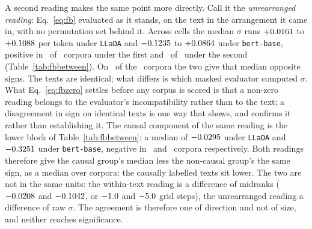 \begin{table}[tbp]
\centering

\caption{The unrearranged reading of Eq.~\eqref{eq:fb}: each text scored
once in each direction, in the arrangement it came in, with no permutation
set and no midrank.  \emph{Upper block}: the median $\sigma$ over all of a
cell's texts, both label groups together, per token.  It is not the authored
component of Eq.~\eqref{eq:auth}, which is a midrank against a null of
$0.50$; the null here is $\sigma = 0$.  \emph{Lower block}: the causal
component of this reading --- the median $\sigma$ of the causally labelled
texts less that of the non-causal ones --- which shares its name with
Eq.~\eqref{eq:caus} but is a difference of raw $\sigma$ values rather than
of midranks.  For a masked evaluator whose conditionals derive from a joint
every entry of both blocks would be exactly zero by Eq.~\eqref{eq:fbzero}.
None is, and on \FbBetweenNOpposite\ of the \FbBetweenNCompared\ corpora
the two masked evaluators give the upper block's median $\sigma$ opposite
signs.}
\label{tab:fbbetween}
\end{table}

A second reading makes the same point more directly.  Call it the
\emph{unrearranged reading}: Eq.~\eqref{eq:fb} evaluated as it stands, on
the text in the arrangement it came in, with no permutation set behind it.
Across cells the median $\sigma$
runs $+0.0161$ to $+0.1088$ per token under
\texttt{LLaDA} and $-0.1235$ to $+0.0864$ under
\texttt{bert-base}, positive in \FbBetweenNPosLLaDA\ of
\FbBetweenNOfLLaDA\ corpora under the first and \FbBetweenNPosBertBase\ of
\FbBetweenNOfBertBase\ under the second (Table~\ref{tab:fbbetween}).  On
\FbBetweenNOpposite\ of the \FbBetweenNCompared\ corpora the two give that
median opposite signs.  The texts are identical; what differs is which masked
evaluator computed $\sigma$.  What Eq.~\eqref{eq:fbzero} settles before any
corpus is scored is that a non-zero reading belongs to the evaluator's
incompatibility rather than to the text; a disagreement in sign on identical
texts is one way that shows, and confirms it rather than establishing it.  The causal
component of the same reading is the lower block of
Table~\ref{tab:fbbetween}: a median of $-0.0295$ under
\texttt{LLaDA} and $-0.3251$ under \texttt{bert-base},
negative in \FbBetweenNNegOfLLaDA\ and \FbBetweenNNegOfBertBase\ corpora
respectively.  Both readings therefore give the causal group's median less
the non-causal group's the same sign, as a median over corpora: the causally
labelled texts sit lower.  The two are not in the same units: the
within-text reading is a difference of midranks ($-0.0208$ and
$-0.1042$, or $-1.0$ and
$-5.0$ grid steps), the unrearranged reading a difference
of raw $\sigma$.  The agreement is therefore one of direction and not of
size, and neither reaches significance.

